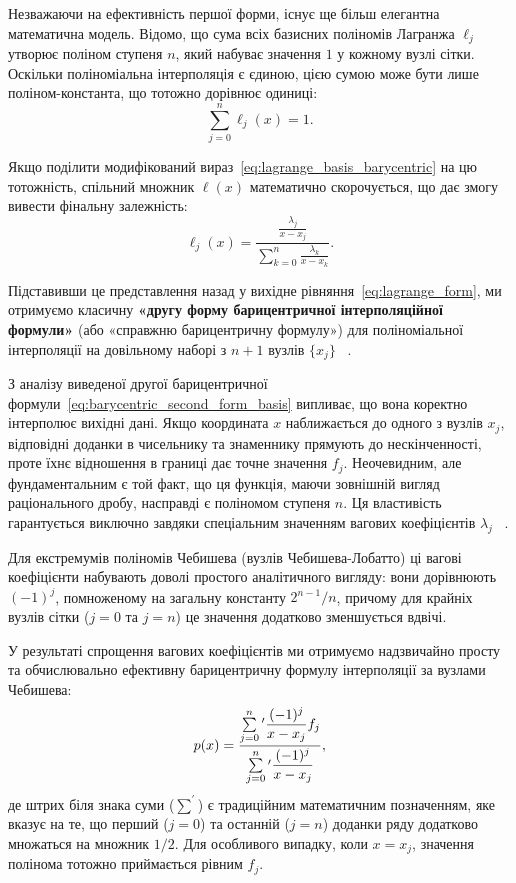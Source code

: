 Незважаючи на ефективність першої форми, існує ще більш елегантна математична модель. Відомо, що сума всіх базисних поліномів Лагранжа $\ell_j$ утворює поліном ступеня $n$, який набуває значення $1$ у кожному вузлі сітки. Оскільки поліноміальна інтерполяція є єдиною, цією сумою може бути лише поліном-константа, що тотожно дорівнює одиниці:
\begin{equation}\label{eq:lagrange_sum_one}
	\sum_{j=0}^{n} \ell_j(x) = 1.
\end{equation}

Якщо поділити модифікований вираз~\eqref{eq:lagrange_basis_barycentric} на цю тотожність, спільний множник $\ell(x)$ математично скорочується, що дає змогу вивести фінальну залежність:
\begin{equation}\label{eq:barycentric_second_form_basis}
	\ell_j(x) = \frac{\frac{\lambda_j}{x - x_j}}{\sum_{k=0}^{n} \frac{\lambda_k}{x - x_k}}.
\end{equation}

Підставивши це представлення назад у вихідне рівняння~\eqref{eq:lagrange_form}, ми отримуємо класичну \textbf{«другу форму барицентричної інтерполяційної формули»} (або «справжню барицентричну формулу») для поліноміальної інтерполяції на довільному наборі з $n+1$ вузлів $\{x_j\}$ ~\cite{trefethen2013approximation}.

З аналізу виведеної другої барицентричної формули~\eqref{eq:barycentric_second_form_basis} випливає, що вона коректно інтерполює вихідні дані. Якщо координата $x$ наближається до одного з вузлів $x_j$, відповідні доданки в чисельнику та знаменнику прямують до нескінченності, проте їхнє відношення в границі дає точне значення $f_j$. Неочевидним, але фундаментальним є той факт, що ця функція, маючи зовнішній вигляд раціонального дробу, насправді є поліномом ступеня $n$. Ця властивість гарантується виключно завдяки спеціальним значенням вагових коефіцієнтів $\lambda_j$ ~\cite{trefethen2013approximation}. 

Для екстремумів поліномів Чебишева (вузлів Чебишева-Лобатто) ці вагові коефіцієнти набувають доволі простого аналітичного вигляду: вони дорівнюють $(-1)^j$, помноженому на загальну константу $2^{n-1}/n$, причому для крайніх вузлів сітки ($j = 0$ та $j = n$) це значення додатково зменшується вдвічі.

%
У результаті спрощення вагових коефіцієнтів ми отримуємо надзвичайно просту та обчислювально ефективну барицентричну формулу інтерполяції за вузлами Чебишева:
\begin{equation}\label{eq:cheb_barycentric}
	p(x) = \frac{\sum\limits_{j=0}^{n} \vphantom{\sum}^{\prime} \dfrac{(-1)^j}{x - x_j} f_j}{\sum\limits_{j=0}^{n} \vphantom{\sum}^{\prime} \dfrac{(-1)^j}{x - x_j}},
\end{equation}
де штрих біля знака суми ($\sum^{\prime}$) є традиційним математичним позначенням, яке вказує на те, що перший ($j=0$) та останній ($j=n$) доданки ряду додатково множаться на множник $1/2$. Для особливого випадку, коли $x = x_j$, значення полінома тотожно приймається рівним $f_j$.

